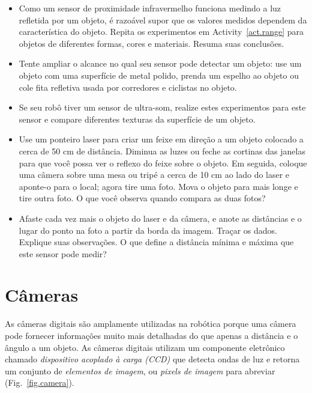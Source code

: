 \begin{framed}

\begin{itemize}
\item Como um sensor de proximidade infravermelho funciona medindo a luz refletida por um objeto, é razoável supor que os valores medidos dependem da característica do objeto. Repita os experimentos em Activity~\ref{act.range} para objetos de diferentes formas, cores e materiais. Resuma suas conclusões.
\item Tente ampliar o alcance no qual seu sensor pode detectar um objeto: use um objeto com uma superfície de metal polido, prenda um espelho ao objeto ou cole fita refletiva usada por corredores e ciclistas no objeto.
\item Se seu robô tiver um sensor de ultra-som, realize estes experimentos para este sensor e compare diferentes texturas da superfície de um objeto.
\end{itemize}
\end{framed}

\begin{framed}

\begin{itemize}
\item Use um ponteiro laser para criar um feixe em direção a um objeto colocado a cerca de 50 cm de distância. Diminua as luzes ou feche as cortinas das janelas para que você possa ver o reflexo do feixe sobre o objeto. Em seguida, coloque uma câmera sobre uma mesa ou tripé a cerca de 10 cm ao lado do laser e aponte-o para o local; agora tire uma foto. Mova o objeto para mais longe e tire outra foto. O que você observa quando compara as duas fotos?
\item Afaste cada vez mais o objeto do laser e da câmera, e anote as distâncias e o lugar do ponto na foto a partir da borda da imagem. Traçar os dados. Explique suas observações. O que define a distância mínima e máxima que este sensor pode medir?
\end{itemize}
\end{framed}

\section{Câmeras}\label{s.cameras}

As câmeras digitais são amplamente utilizadas na robótica porque uma câmera pode fornecer informações muito mais detalhadas do que apenas a distância e o ângulo a um objeto. As câmeras digitais utilizam um componente eletrônico chamado \emph{dispositivo acoplado à carga (CCD)} que detecta ondas de luz e retorna um conjunto de \emph{elementos de imagem}, ou \emph{pixels de imagem} para abreviar (Fig.~\ref{fig.camera}).

